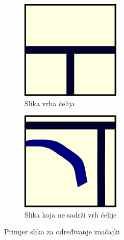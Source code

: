 \documentclass[times, utf8, zavrsni, numeric]{fer}
\begin{document}
\begin{figure}[th!]
    \centering
    \begin{subfigure}{.5\textwidth}
        \centering
        \includegraphics[width=.45\linewidth]{Images/Feature_true_0.png}
        \captionsetup{justification=centering}
        \caption{Slika vrha ćelija}
        \label{fig:featureDemo0a}
    \end{subfigure}%
    \begin{subfigure}{.5\textwidth}
        \centering
        \includegraphics[width=.45\linewidth]{Images/Feature_false_0.png}
        \caption{Slika koja ne sadrži vrh ćelije}
        \label{fig:featureDemo0b}
    \end{subfigure}
    \caption{Primjer slika za određivanje značajki}
    \label{fig:featureDemo0}
\end{figure}
\end{document}
